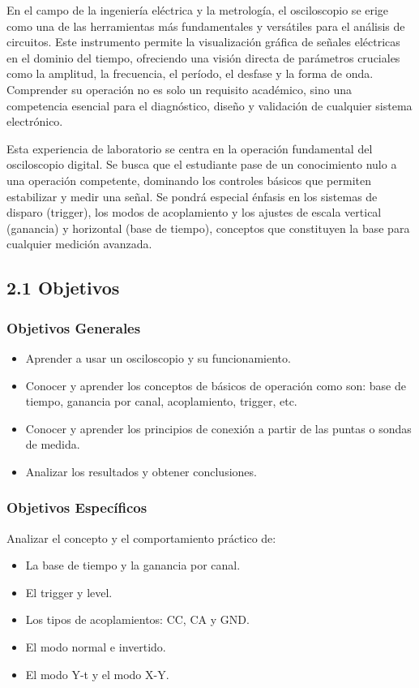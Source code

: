 
En el campo de la ingeniería eléctrica y la metrología, el osciloscopio se erige como una de las herramientas más fundamentales y versátiles para el análisis de circuitos. Este instrumento permite la visualización gráfica de señales eléctricas en el dominio del tiempo, ofreciendo una visión directa de parámetros cruciales como la amplitud, la frecuencia, el período, el desfase y la forma de onda. Comprender su operación no es solo un requisito académico, sino una competencia esencial para el diagnóstico, diseño y validación de cualquier sistema electrónico.

Esta experiencia de laboratorio se centra en la operación fundamental del osciloscopio digital. Se busca que el estudiante pase de un conocimiento nulo a una operación competente, dominando los controles básicos que permiten estabilizar y medir una señal. Se pondrá especial énfasis en los sistemas de disparo (trigger), los modos de acoplamiento y los ajustes de escala vertical (ganancia) y horizontal (base de tiempo), conceptos que constituyen la base para cualquier medición avanzada.

\subsection*{2.1 Objetivos}

\subsubsection*{Objetivos Generales}
\begin{itemize}
    \item Aprender a usar un osciloscopio y su funcionamiento.
    \item Conocer y aprender los conceptos de básicos de operación como son: base de tiempo, ganancia por canal, acoplamiento, trigger, etc.
    \item Conocer y aprender los principios de conexión a partir de las puntas o sondas de medida.
    \item Analizar los resultados y obtener conclusiones.
\end{itemize}

\subsubsection*{Objetivos Específicos}
Analizar el concepto y el comportamiento práctico de:
\begin{itemize}
    \item La base de tiempo y la ganancia por canal.
    \item El trigger y level.
    \item Los tipos de acoplamientos: CC, CA y GND.
    \item El modo normal e invertido.
    \item El modo Y-t y el modo X-Y.
\end{itemize}